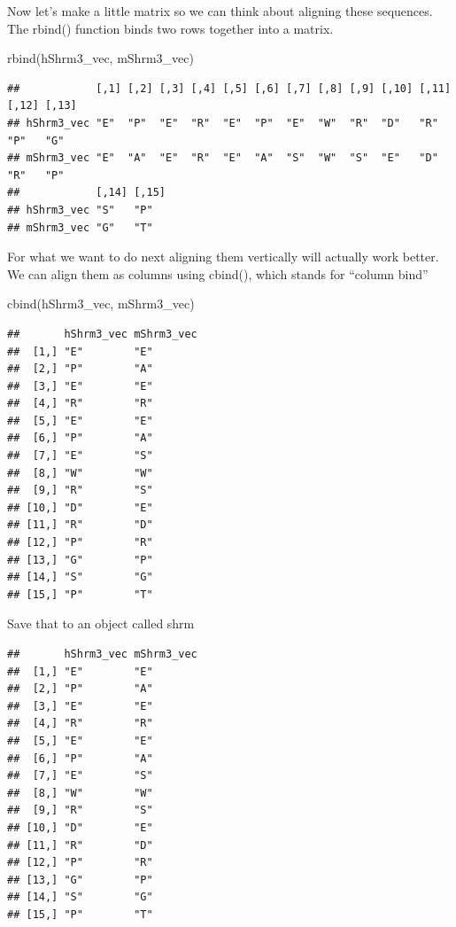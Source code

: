 \documentclass[
]{book}
\newenvironment{Shaded}{\begin{snugshade}}{\end{snugshade}}
\newcommand{\FunctionTok}[1]{\textcolor[rgb]{0.00,0.00,0.00}{#1}}
\newcommand{\NormalTok}[1]{#1}
\begin{document}
Now let's make a little matrix so we can think about aligning these sequences. The rbind() function binds two rows together into a matrix.

\begin{Shaded}
\begin{Highlighting}[]
\FunctionTok{rbind}\NormalTok{(hShrm3\_vec, mShrm3\_vec)}
\end{Highlighting}
\end{Shaded}

\begin{verbatim}
##            [,1] [,2] [,3] [,4] [,5] [,6] [,7] [,8] [,9] [,10] [,11] [,12] [,13]
## hShrm3_vec "E"  "P"  "E"  "R"  "E"  "P"  "E"  "W"  "R"  "D"   "R"   "P"   "G"  
## mShrm3_vec "E"  "A"  "E"  "R"  "E"  "A"  "S"  "W"  "S"  "E"   "D"   "R"   "P"  
##            [,14] [,15]
## hShrm3_vec "S"   "P"  
## mShrm3_vec "G"   "T"
\end{verbatim}

For what we want to do next aligning them vertically will actually work better. We can align them as columns using cbind(), which stands for ``column bind''

\begin{Shaded}
\begin{Highlighting}[]
\FunctionTok{cbind}\NormalTok{(hShrm3\_vec, mShrm3\_vec)}
\end{Highlighting}
\end{Shaded}

\begin{verbatim}
##       hShrm3_vec mShrm3_vec
##  [1,] "E"        "E"       
##  [2,] "P"        "A"       
##  [3,] "E"        "E"       
##  [4,] "R"        "R"       
##  [5,] "E"        "E"       
##  [6,] "P"        "A"       
##  [7,] "E"        "S"       
##  [8,] "W"        "W"       
##  [9,] "R"        "S"       
## [10,] "D"        "E"       
## [11,] "R"        "D"       
## [12,] "P"        "R"       
## [13,] "G"        "P"       
## [14,] "S"        "G"       
## [15,] "P"        "T"
\end{verbatim}

Save that to an object called shrm

\begin{verbatim}
##       hShrm3_vec mShrm3_vec
##  [1,] "E"        "E"       
##  [2,] "P"        "A"       
##  [3,] "E"        "E"       
##  [4,] "R"        "R"       
##  [5,] "E"        "E"       
##  [6,] "P"        "A"       
##  [7,] "E"        "S"       
##  [8,] "W"        "W"       
##  [9,] "R"        "S"       
## [10,] "D"        "E"       
## [11,] "R"        "D"       
## [12,] "P"        "R"       
## [13,] "G"        "P"       
## [14,] "S"        "G"       
## [15,] "P"        "T"
\end{verbatim}
\end{document}
